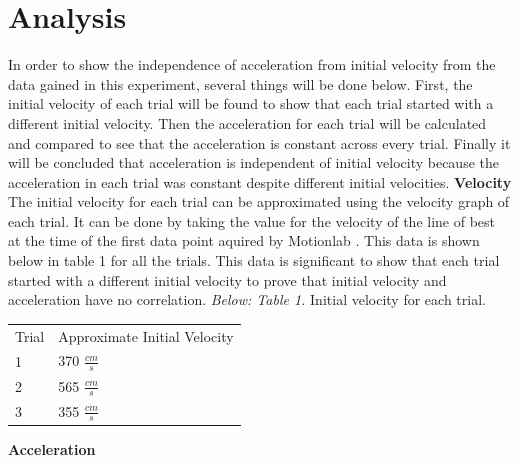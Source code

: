 \documentclass[12pt,letterpaper]{article}
\begin{document}
\section{Analysis}
In order to show the independence of acceleration from initial velocity from the data gained in this experiment, several things will be done below. First, the initial velocity of each trial will be found to show that each trial started with a different initial velocity. Then the acceleration for each trial will be calculated and compared to see that the acceleration is constant across every trial. Finally it will be concluded that acceleration is independent of initial velocity because the acceleration in each trial was constant despite different initial velocities.
\newline\newline
\textbf{Velocity}
\newline
The initial velocity for each trial can be approximated using the velocity graph of each trial. It can be done by taking the value for the velocity of the line of best at the time of the first data point aquired by Motionlab . This data is shown below in table 1 for all the trials. This data is significant to show that each trial started with a different initial velocity to prove that initial velocity and acceleration have no correlation.
\newline\newline
\textit{Below: Table 1.} Initial velocity for each trial.
{\renewcommand{\arraystretch}{1.2}
\begin{table}[h]
\hspace*{1.6in}
\begin{tabular}{ll}
Trial  \hspace{.75in} & Approximate Initial Velocity\\
\hspace{.14in}1&\hspace{.7in}370 \(\frac{cm}{s}\)\\
\hspace{.14in}2&\hspace{.7in}565 \(\frac{cm}{s}\)\\
\hspace{.14in}3&\hspace{.7in}355 \(\frac{cm}{s}\)\\                 
\end{tabular}
\end{table}
\newline
}
\textbf{Acceleration}
\newline
\end{document}
